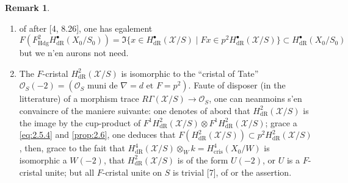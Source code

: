 \documentclass[12pt,a4paper]{article}
\theoremstyle{plain}
\theoremstyle{definition}
\newtheorem{remark}[theorem]{Remark}
\theoremstyle{remark}
\newcommand{\Hdg}{\mathrm{Hdg}}
\begin{document}
\begin{remark}\label{rem:2.7}
\begin{enumerate}[label=\alph*)]
\item of after [4, 8.26], one has egalement
\begin{equation}\label{eq:2.7.1}
F(F^2_{\Hdg} H^{\bullet}_{\mathrm{dR}}(X_0/S_0)) = \Im\{x \in H^{\bullet}_{\mathrm{dR}}(\mathcal{X}/S) \mid Fx \in p^2 H^{\bullet}_{\mathrm{dR}}(\mathcal{X}/S)\} \subset H^{\bullet}_{\mathrm{dR}}(X_0/S_0)
\end{equation}
but we n'en aurons not need.

\item The $F$-cristal $H^2_{\mathrm{dR}}(\mathcal{X}/S)$ is isomorphic to the ``cristal of Tate'' $\mathcal{O}_S(-2) = (\mathcal{O}_S \text{ muni de } \nabla = d \text{ et } F = p^2)$. Faute of disposer (in the litterature) of a morphism trace $R\Gamma(\mathcal{X}/S) \to \mathcal{O}_S$, one can neanmoins s'en convaincre of the maniere suivante: one denotes of abord that $H^2_{\mathrm{dR}}(\mathcal{X}/S)$ is the image by the cup-product of $F^1 H^2_{\mathrm{dR}}(\mathcal{X}/S) \otimes F^1 H^2_{\mathrm{dR}}(\mathcal{X}/S)$; grace a \eqref{eq:2.5.4} and \ref{prop:2.6}, one deduces that $F(H^2_{\mathrm{dR}}(\mathcal{X}/S)) \subset p^2 H^2_{\mathrm{dR}}(\mathcal{X}/S)$, then, grace to the fait that $H^4_{\mathrm{dR}}(\mathcal{X}/S) \otimes_W k = H^4_{\mathrm{cris}}(X_0/W)$ is isomorphic a $W(-2)$, that $H^2_{\mathrm{dR}}(\mathcal{X}/S)$ is of the form $U(-2)$, or $U$ is a $F$-cristal unite; but all $F$-cristal unite on $S$ is trivial [7], of or the assertion.
\end{enumerate}
\end{remark}

\subsection{}
\end{document}
